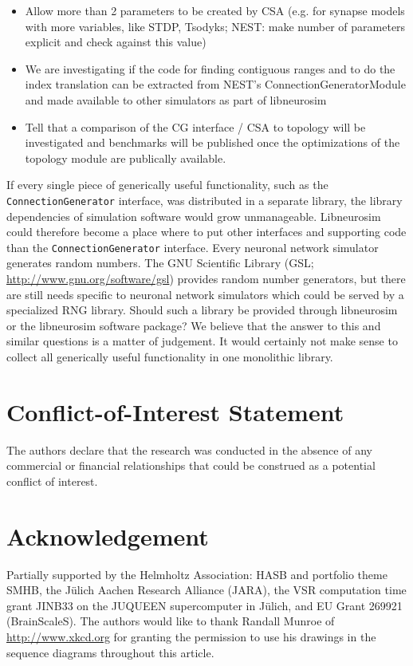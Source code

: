 \documentclass{frontiersSCNS} %
\begin{document}
\begin{itemize}
\item Allow more than 2 parameters to be created by CSA (e.g. for
  synapse models with more variables, like STDP, Tsodyks; NEST: make
  number of parameters explicit and check against this value)
\item We are investigating if the code for finding contiguous ranges
  and to do the index translation can be extracted from NEST's
  ConnectionGeneratorModule and made available to other simulators as
  part of libneurosim
\item Tell that a comparison of the CG interface / CSA to topology
  will be investigated and benchmarks will be published once the
  optimizations of the topology module are publically available.
\end{itemize}

If every single piece of generically useful functionality, such as the
\verb|ConnectionGenerator| interface, was distributed in a separate
library, the library dependencies of simulation software would grow
unmanageable.  Libneurosim could therefore become a place where to put
other interfaces and supporting code than the
\verb|ConnectionGenerator| interface.  Every neuronal network
simulator generates random numbers. The GNU Scientific Library (GSL;
\url{http://www.gnu.org/software/gsl}) provides random number
generators, but there are still needs specific to neuronal network
simulators which could be served by a specialized RNG library. Should
such a library be provided through libneurosim or the libneurosim
software package?  We believe that the answer to this and similar
questions is a matter of judgement. It would certainly not make sense
to collect all generically useful functionality in one monolithic
library.


\section*{Conflict-of-Interest Statement}
The authors declare that the research was conducted in the absence of
any commercial or financial relationships that could be construed as a
potential conflict of interest.

\section*{Acknowledgement}
Partially supported by the Helmholtz Association: HASB and portfolio
theme SMHB, the Jülich Aachen Research Alliance (JARA), the VSR
computation time grant JINB33 on the JUQUEEN supercomputer in Jülich,
and EU Grant 269921 (BrainScaleS). The authors would like to thank
Randall Munroe of \url{http://www.xkcd.org} for granting the permission to
use his drawings in the sequence diagrams throughout this article.
\end{document}

